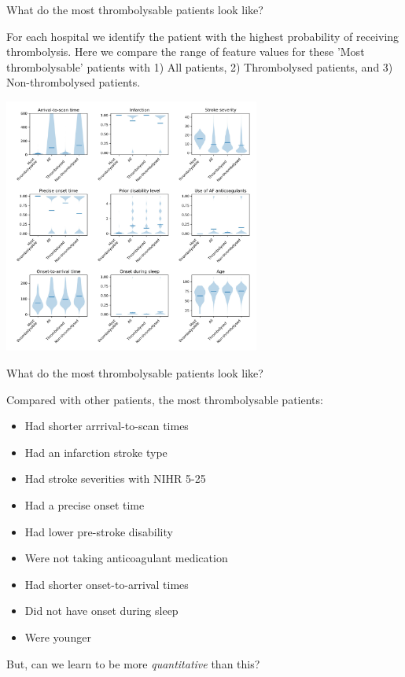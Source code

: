 \documentclass{beamer}
\begin{document}

\begin{frame}{What do the most thrombolysable patients look like?}

\scriptsize For each hospital we identify the patient with the highest probability of receiving thrombolysis. Here we compare the range of feature values for these 'Most thrombolysable' patients with 1) All patients, 2) Thrombolysed patients, and 3) Non-thrombolysed patients.


\begin{center}
\includegraphics[width=0.63\textwidth]{./images/02a_most_thrombolsyable_violin.jpg}
\end{center}

\end{frame}


\begin{frame}{What do the most thrombolysable patients look like?}

Compared with other patients, the  most thrombolysable patients:

\vspace{3mm}

\begin{itemize}
\item Had shorter arrrival-to-scan times
\item Had an infarction stroke type
\item Had stroke severities with NIHR 5-25
\item Had a precise onset time
\item Had lower pre-stroke disability
\item Were not taking anticoagulant medication
\item Had shorter onset-to-arrival times
\item Did not have onset during sleep
\item Were younger
\end{itemize}

\vspace{3mm}

But, can we learn to be more \emph{quantitative} than this?

\end{frame}
\end{document}
